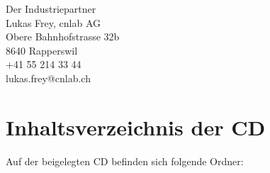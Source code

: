 Der Industriepartner\\
Lukas Frey, cnlab AG\\
Obere Bahnhofstrasse 32b\\
8640 Rapperswil\\
+41 55 214 33 44\\
lukas.frey@cnlab.ch

\section{Inhaltsverzeichnis der CD}
Auf der beigelegten CD befinden sich folgende Ordner:
%

